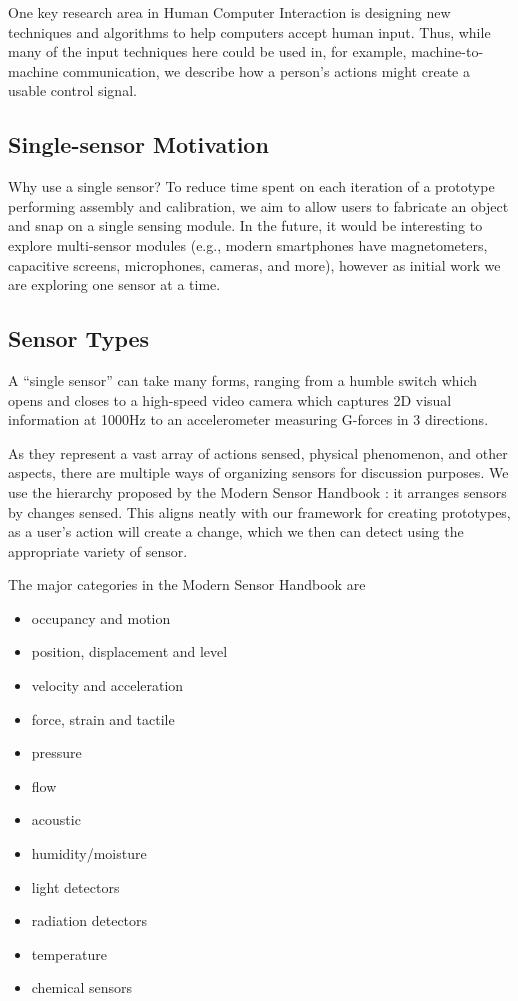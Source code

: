 One key research area in Human Computer Interaction is designing new techniques and algorithms to help computers accept human input. Thus, while many of the input techniques here could be used in, for example, machine-to-machine communication, we describe how a person's actions might create a usable control signal.

\subsection{Single-sensor Motivation}

Why use a single sensor? To reduce time spent on each iteration of a prototype performing assembly and calibration, we aim to allow users to fabricate an object and snap on a single sensing module. In the future, it would be interesting to explore multi-sensor modules (e.g., modern smartphones have magnetometers, capacitive screens, microphones, cameras, and more), however as initial work we are exploring one sensor at a time.

\subsection{Sensor Types}

A ``single sensor'' can take many forms, ranging from a humble switch which opens and closes to a high-speed video camera which captures 2D visual information at 1000Hz to an accelerometer measuring G-forces in 3 directions.

As they represent a vast array of actions sensed, physical phenomenon, and other aspects, there are multiple ways of organizing sensors for discussion purposes. We use the hierarchy proposed by the Modern Sensor Handbook \cite{fraden-modernsensors}: it arranges sensors by changes sensed. This aligns neatly with our framework for creating prototypes, as a user's action will create a change, which we then can detect using the appropriate variety of sensor.

The major categories in the Modern Sensor Handbook are
\begin{itemize}
    \item occupancy and motion
    \item position, displacement and level
    \item velocity and acceleration
    \item force, strain and tactile
    \item pressure
    \item flow
    \item acoustic
    \item humidity/moisture
    \item light detectors
    \item radiation detectors
    \item temperature
    \item chemical sensors
\end{itemize}

